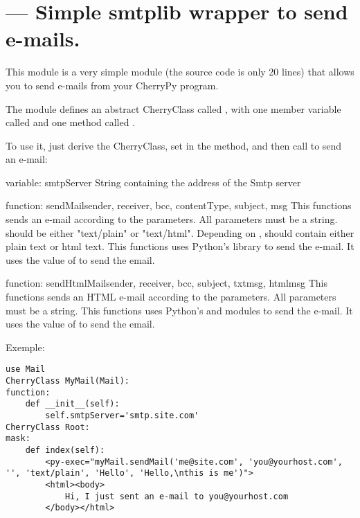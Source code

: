 \section{ --- Simple smtplib wrapper to send e-mails.}

This module is a very simple module (the source code is only 20 lines) that allows you to send e-mails from
your CherryPy program.

The module defines an abstract CherryClass called , with one member variable called  and
one method called .

To use it, just derive the  CherryClass, set  in the  method, and then
call  to send an e-mail:

\begin{memberdesc}{variable: smtpServer}
String containing the address of the Smtp server
\end{memberdesc}

\begin{funcdesc}{function: sendMail}{sender, receiver, bcc, contentType, subject, msg}
This functions sends an e-mail according to the parameters. All parameters must be a string.  should be
either "text/plain" or "text/html". Depending on ,  should contain either plain text or html text.
This functions uses Python's  library to send the e-mail. It uses the value of  to send
the email.
\end{funcdesc}

\begin{funcdesc}{function: sendHtmlMail}{sender, receiver, bcc, subject, txtmsg, htmlmsg}
This functions sends an HTML e-mail according to the parameters. All parameters must be a string.
This functions uses Python's  and  modules to send the e-mail. It uses the value of  to send the email.
\end{funcdesc}

Exemple:
\begin{verbatim}
use Mail
CherryClass MyMail(Mail):
function:
    def __init__(self):
        self.smtpServer='smtp.site.com'
CherryClass Root:
mask:
    def index(self):
        <py-exec="myMail.sendMail('me@site.com', 'you@yourhost.com', '', 'text/plain', 'Hello', 'Hello,\nthis is me')">
        <html><body>
            Hi, I just sent an e-mail to you@yourhost.com
        </body></html>
\end{verbatim}
